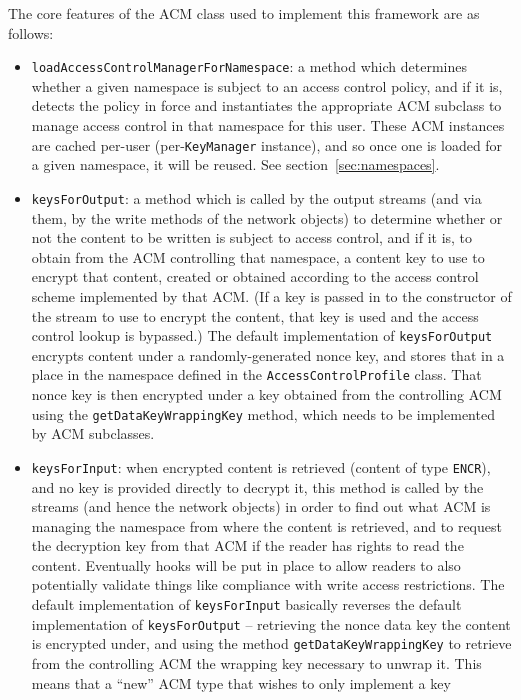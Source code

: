 The core features of the ACM class used to implement this framework are as follows:

\begin{itemize}
\item {\tt loadAccessControlManagerForNamespace}: a method which determines whether a given 
  namespace is subject to an access control policy, and if it is, detects the policy in force
  and instantiates the appropriate ACM subclass to manage access control in that namespace for
  this user. These ACM instances are cached per-user (per-{\tt KeyManager} instance), and so
  once one is loaded for a given namespace, it will be reused. See section~\ref{sec:namespaces}.
\item {\tt keysForOutput}: a method which is called by the output streams (and via them, by the
  write methods of the network objects) to determine whether or not the content to be written is
  subject to access control, and if it is, to obtain from the ACM controlling that namespace,
  a content key to use to encrypt that content, created or obtained according to the access control
  scheme implemented by that ACM. (If a key is passed in to the constructor of the stream to use
  to encrypt the content, that key is used and the access control lookup is bypassed.) The default
  implementation of {\tt keysForOutput} encrypts content under a randomly-generated nonce key,
  and stores that in a place in the namespace defined in the {\tt AccessControlProfile} class. That
  nonce key is then encrypted under a key obtained from the controlling ACM using the 
  {\tt getDataKeyWrappingKey} method, which needs to be implemented by ACM subclasses.
\item {\tt keysForInput}: when encrypted content is retrieved (content
  of type {\tt ENCR}), and no key is provided directly to decrypt it,
  this method is called by the streams (and hence the network objects)
  in order to find out what ACM is managing the namespace from where the content is retrieved,
  and to request the decryption key from that ACM if the reader has rights to read the content. Eventually
  hooks will be put in place to allow readers to also potentially validate things like compliance with
  write access restrictions. The default implementation of {\tt keysForInput} basically reverses the
  default implementation of {\tt keysForOutput} -- retrieving the nonce data key the content is encrypted
  under, and using the method {\tt getDataKeyWrappingKey} to retrieve from the controlling ACM the wrapping
  key necessary to unwrap it. This means that a ``new'' ACM type that wishes to only implement a key

\end{itemize}
